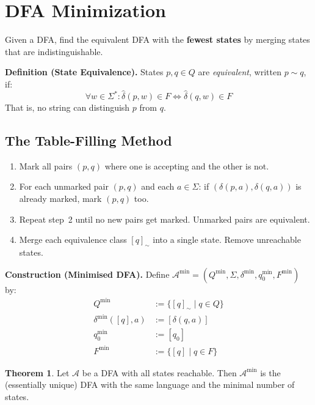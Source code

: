 \documentclass[11pt, a4paper]{article}
\theoremstyle{definition}
\newtheorem{theorem}{Theorem}[section]
\theoremstyle{remark}
\newcommand{\dfa}{\mathcal{A}}
\newcommand{\hatdelta}{\widehat{\delta}}
\begin{document}
\section{DFA Minimization}

Given a DFA, find the equivalent DFA with the \textbf{fewest states} by merging states that
are indistinguishable.

\begin{defbox}
\textbf{Definition (State Equivalence).}  States $p,q\in Q$ are \emph{equivalent},
written $p\sim q$, if:
\[
  \forall w\in\Sigma^*\colon
  \hatdelta(p,w)\in F\iff\hatdelta(q,w)\in F
\]
That is, no string can distinguish $p$ from $q$.
\end{defbox}

\subsection{The Table-Filling Method}

\begin{enumerate}[itemsep=4pt]
  \item Mark all pairs $(p,q)$ where one is accepting and the other is not.
  \item For each unmarked pair $(p,q)$ and each $a\in\Sigma$: if
        $(\delta(p,a),\delta(q,a))$ is already marked, mark $(p,q)$ too.
  \item Repeat step~2 until no new pairs get marked.  Unmarked pairs are equivalent.
  \item Merge each equivalence class $[q]_\sim$ into a single state.  Remove
        unreachable states.
\end{enumerate}

\begin{defbox}
\textbf{Construction (Minimised DFA).}
Define $\dfa^{\min}=(Q^{\min},\Sigma,\delta^{\min},q_0^{\min},F^{\min})$ by:
\begin{align*}
  Q^{\min}             &:=\{[q]_{\sim}\mid q\in Q\} \\
  \delta^{\min}([q],a) &:=[\delta(q,a)] \\
  q_0^{\min}           &:=[q_0] \\
  F^{\min}             &:=\{[q]\mid q\in F\}
\end{align*}
\end{defbox}

\begin{theorem}
Let $\dfa$ be a DFA with all states reachable.  Then $\dfa^{\min}$ is the (essentially
unique) DFA with the same language and the minimal number of states.
\end{theorem}
\end{document}
